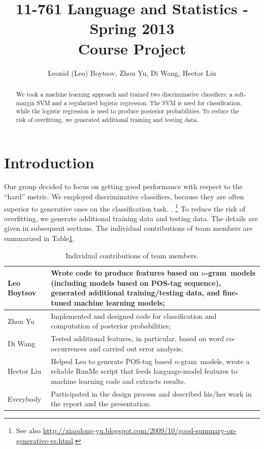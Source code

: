 \documentclass[11pt]{article}
\newcommand{\ngram}{\mbox{$n$-gram }}
\newcommand{\leocomment}[1]{\todo[color=red!40,caption={Leo's comment}]{#1}}
\begin{document}
\title{11-761 Language and Statistics - Spring 2013\\
Course Project}
\author{Leonid (Leo) Boytsov, Zhou Yu, Di Wang, Hector Liu}
\date{}
\maketitle

\begin{abstract}
We took a machine learning approach and trained two discriminative classifiers:
a soft-margin SVM and a regularized logistic regression.
The SVM is used for classification, while the logistic regression is used to produce posterior probabilities.
To reduce the risk of overfitting, we generated additional training and testing data.
\end{abstract}


\section{Introduction}
Our group decided to focus on getting good performance with respect to the ``hard'' metric.
We employed discriminative classifiers,
because they are often superior to generative ones on the classification task. \leocomment{I have simplified here.}\cite{roni2013,bishop2007generative}.
\footnote{See also \url{http://xiaodong-yu.blogspot.com/2009/10/good-summary-on-generative-vs.html}.}
To reduce the risk of overfitting, we generate additional training data and testing data.
The details are given in subsequent sections. The individual contributions of team members are summarized in Table\ref{TableContrib}.


\leocomment{Please, revise.}
\begin{table}[H]
\begin{tabular}{p{1in}|p{5in}}
\hline
Leo Boytsov &  Wrote code to produce features based on \ngram models (including models based on POS-tag sequence), generated additional training/testing data, and fine-tuned machine learning models;
\\\hline
Zhou Yu & Implemented and designed code for classification and computation of posterior probabilities;
\\\hline
Di Wang & Tested additional features, in particular, based on word co-occurrences and
carried out error analysis;
\\\hline
Hector Liu & Helped Leo to generate POS-tag based \ngram models, wrote a
reliable RunMe script that feeds language-model features to machine learning code
and extracts results.
\\\hline
Everybody & Participated in the design process and described his/her work
in the report and the presentation.
\\\hline
\end{tabular}

\caption{\label{TableContrib}Individual contributions of team members.}
\end{table}
\end{document}
